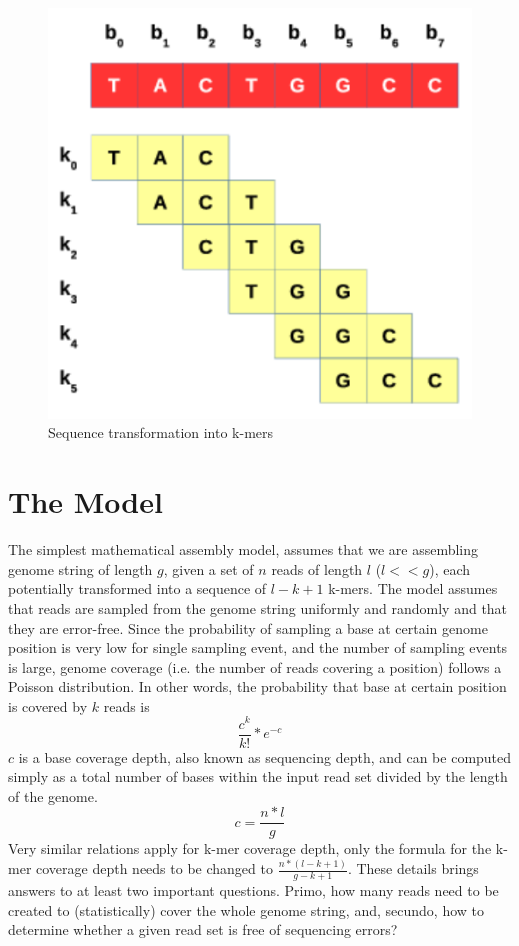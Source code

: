 \begin{figure}[h] 
	\centering 
	\includegraphics{img/seq-division.pdf} 
	\caption{Sequence transformation into k-mers} 
	\label{fig:seq-division} 
\end{figure} 

\section{The Model} 
\label{sec:the-model} 

The simplest mathematical assembly model, assumes that we are assembling genome string of length $g$, given a set of $n$ reads of length $l$ ($l << g$), each potentially transformed into a sequence of $l-k+1$ k-mers. The model assumes that reads are sampled from the genome string uniformly and randomly and that they are error-free. Since the probability of sampling a base at certain genome position is very low for single sampling event, and the number of sampling events is large, genome coverage (i.e. the number of reads covering a position) follows a Poisson distribution. In other words, the probability that base at certain position is covered by $k$ reads is 
$$ 
\frac{c^k}{k!}*e^{-c} 
$$ 
$c$ is a base coverage depth, also known as sequencing depth, and can be computed simply as a total number of bases within the input read set divided by the length of the genome. 
$$ 
c = \frac{n * l}{g} 
$$ 
Very similar relations apply for k-mer coverage depth, only the formula for the k-mer coverage depth needs to be changed to $\frac{n*(l - k + 1)}{g - k + 1}$. These details brings answers to at least two important questions. Primo, how many reads need to be created to (statistically) cover the whole genome string, and, secundo, how to determine whether a given read set is free of sequencing errors? 

